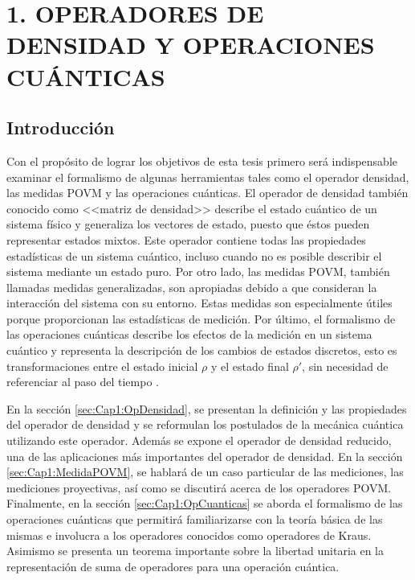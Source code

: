 \chapter[OPERADORES DE DENSIDAD Y OPERACIONES CUÁNTICAS]{1. OPERADORES DE DENSIDAD Y OPERACIONES CUÁNTICAS}
\section{Introducción}\label{cap:IntroduccionMarcoteorico} %

Con el propósito de lograr los objetivos de esta tesis primero será
indispensable examinar el formalismo de algunas herramientas tales como el
operador densidad, las medidas POVM y las operaciones cuánticas. El operador de
densidad también conocido como <<matriz de densidad>> describe el estado
cuántico de un sistema físico y generaliza los vectores de estado, puesto que
éstos pueden representar estados mixtos. Este operador contiene todas las
propiedades estadísticas de un sistema cuántico, incluso cuando no es posible
describir el sistema mediante un estado puro. Por otro lado, las medidas POVM,
también llamadas medidas generalizadas, son apropiadas debido a que consideran
la interacción del sistema con su entorno. Estas medidas son especialmente
útiles porque proporcionan las estadísticas de medición. Por último, el
formalismo de las operaciones cuánticas describe los efectos de la medición en
un sistema cuántico y representa la descripción de los cambios  de estados
discretos, esto es transformaciones entre el estado inicial $\rho$ y el estado
final $\rho'$, sin necesidad de referenciar al paso del tiempo
{\cite{nielsen_chuang_2010}}.  


En la sección {\ref{sec:Cap1:OpDensidad}}, se presentan la definición y las propiedades del
operador de densidad y se reformulan los postulados de la mecánica cuántica
utilizando este operador. Además se expone el operador de densidad reducido,
una de las aplicaciones más importantes del operador de densidad. En la sección {\ref{sec:Cap1:MedidaPOVM}}, se hablará de un caso particular de las mediciones, las mediciones proyectivas, así como se discutirá acerca de los operadores POVM\@. Finalmente, en la sección {\ref{sec:Cap1:OpCuanticas}} se aborda el formalismo de las operaciones cuánticas que permitirá familiarizarse con la teoría básica de las mismas e involucra a los operadores conocidos como operadores de Kraus. Asimismo se presenta un teorema importante sobre la libertad unitaria en la representación de suma de
operadores para una operación cuántica.
